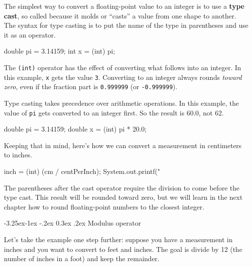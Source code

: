 \documentclass[12pt]{book}
\makeatletter
\renewcommand\subsection{\@startsection{subsection}{2}{\z@}%
    {-3.25ex\@plus -1ex \@minus -.2ex}%
    {0.3ex \@plus .2ex}%
    {\normalfont\large\bfseries}}
\theoremstyle{exercise}
\newcommand{\java}[1]{\lstinline{#1}} %
\makeatother
\begin{document}

The simplest way to convert a floating-point value to an integer is to use a {\bf type cast}, so called because it molds or ``casts'' a value from one shape to another.
The syntax for type casting is to put the name of the type in parentheses and use it as an operator.

\begin{code}
    double pi = 3.14159;
    int x = (int) pi;
\end{code}


The \java{(int)} operator has the effect of converting what follows into an integer.
In this example, \java{x} gets the value \java{3}.
Converting to an integer always rounds {\em toward zero}, even if the fraction part is \java{0.999999} (or \java{-0.999999}).

Type casting takes precedence over arithmetic operations.
In this example, the value of \java{pi} gets converted to an integer first.
So the result is 60.0, not 62.

\begin{code}
    double pi = 3.14159;
    double x = (int) pi * 20.0;
\end{code}


Keeping that in mind, here's how we can convert a measurement in centimeters to inches.

\begin{code}
    inch = (int) (cm / centPerInch);
    System.out.printf("%
\end{code}

The parentheses after the cast operator require the division to come before the type cast.
This result will be rounded toward zero, but we will learn in the next chapter how to round floating-point numbers to the closest integer.

\subsection{Modulus operator}

Let's take the example one step further: suppose you have a measurement in inches and you want to convert to feet and inches.
The goal is divide by 12 (the number of inches in a foot) and keep the remainder.

\end{document}
